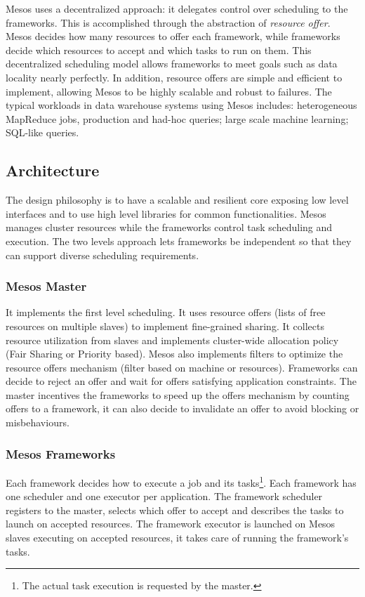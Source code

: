 	Mesos uses a decentralized approach: it delegates
	control over scheduling to the frameworks. This is accomplished through the abstraction of \textit{resource
	offer}.\newline
	Mesos decides how many resources to offer each framework,
	while frameworks decide which resources to accept
	and which tasks to run on them. This decentralized
	scheduling model allows frameworks to meet
	goals such as data locality nearly perfectly. In addition,
	resource offers are simple and efficient to implement, allowing Mesos to be highly scalable and robust to failures.\newline
	\newline
	The typical workloads in data warehouse systems using Mesos includes: heterogeneous MapReduce jobs, production and had-hoc queries; large scale machine learning; SQL-like queries.
	\subsection{Architecture}
	The design philosophy is to have a scalable and resilient core exposing low level interfaces and to use high level libraries for common functionalities.\newline
	Mesos manages cluster resources while the frameworks control task scheduling and execution.\newline
	The two levels approach lets frameworks be independent so that they can support diverse scheduling requirements.
		\subsubsection{Mesos Master}
		It implements the first level scheduling. It uses resource offers (lists of free resources on multiple slaves) to implement fine-grained sharing. It collects resource utilization from slaves and implements cluster-wide allocation policy (Fair Sharing or Priority based).\newline
		Mesos also implements filters to optimize the resource offers mechanism (filter based on machine or resources). Frameworks can decide to reject an offer and wait for offers satisfying application constraints.\newline
		The master incentives the frameworks to speed up the offers mechanism by counting offers to a framework, it can also decide to invalidate an offer to avoid blocking or misbehaviours.
		\subsubsection{Mesos Frameworks}
		Each framework decides how to execute a job and its tasks\footnote{The actual task execution is requested by the master.}. Each framework has one scheduler and one executor per application. The framework scheduler registers to the master, selects which offer to accept and describes the tasks to launch on accepted resources.\newline
		The framework executor is launched on Mesos slaves executing on accepted resources, it takes care of running the framework's tasks.
